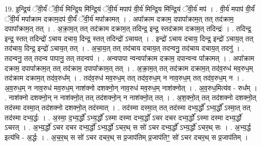 \documentclass[17pt]{extarticle}
\begin{document}
19. इ॒न्द्रि॒यं ॅवी॒र्यं॑ ॅवी॒र्य॑ मिन्द्रि॒य मि॑न्द्रि॒यं ॅवी॒र्य॑ मपाप॑ वी॒र्य॑ मिन्द्रि॒य मि॑न्द्रि॒यं ॅवी॒र्य॑ मप॑ । . वी॒र्य॑ मपाप॑ वी॒र्यं॑ ॅवी॒र्य॑ मपा᳚क्राम दक्राम॒दप॑ वी॒र्यं॑ ॅवी॒र्य॑ मपा᳚क्रामत् । . अपा᳚क्राम दक्राम॒ दपापा᳚क्राम॒त् तत् तद॑क्राम॒ दपापा᳚क्राम॒त् तत् । . अ॒क्रा॒म॒त् तत् तद॑क्राम दक्राम॒त् तदिन्द्र॒ इन्द्र॒ स्तद॑क्राम दक्राम॒त् तदिन्द्रः॑ । . तदिन्द्र॒ इन्द्र॒ स्तत् तदिन्द्रो॑ ऽचाय दचाय॒ दिन्द्र॒ स्तत् तदिन्द्रो॑ ऽचायत् । . इन्द्रो॑ ऽचाय दचाय॒ दिन्द्र॒ इन्द्रो॑ ऽचाय॒त् तत् तद॑चाय॒ दिन्द्र॒ इन्द्रो॑ ऽचाय॒त् तत् । . अ॒चा॒य॒त् तत् तद॑चाय दचाय॒त् तदन्वनु॒ तद॑चाय दचाय॒त् तदनु॑ । . तदन्वनु॒ तत् तदन्व पापानु॒ तत् तदन्वप॑ । . अन्वपापा न्वन्वपा᳚क्राम दक्राम॒ दपान्वन्व पा᳚क्रामत् । . अपा᳚क्राम दक्राम॒ दपापा᳚क्राम॒त् तत् तद॑क्राम॒ दपापा᳚क्राम॒त् तत् । . अ॒क्रा॒म॒त् तत् तद॑क्राम दक्राम॒त् तद॑व॒रुध॑ मव॒रुध॒म् तद॑क्राम दक्राम॒त् तद॑व॒रुध᳚म् । . तद॑व॒रुध॑ मव॒रुध॒म् तत् तद॑व॒रुध॒म् न नाव॒रुध॒म् तत् तद॑व॒रुध॒म् न । . अ॒व॒रुध॒म् न नाव॒रुध॑ मव॒रुध॒म् नाश॑क्नो दशक्नो॒न् नाव॒रुध॑ मव॒रुध॒म् नाश॑क्नोत् । . अ॒व॒रुध॒मित्य॑व - रुध᳚म् । . नाश॑क्नो दशक्नो॒न् न नाश॑क्नो॒त् तत् तद॑शक्नो॒न् न नाश॑क्नो॒त् तत् । . अ॒श॒क्नो॒त् तत् तद॑शक्नो दशक्नो॒त् तद॑स्मा दस्मा॒त् तद॑शक्नो दशक्नो॒त् तद॑स्मात् । . तद॑स्मा दस्मा॒त् तत् तद॑स्मा दभ्य॒र्द्धो᳚ ऽभ्य॒र्द्धो᳚ ऽस्मा॒त् तत् तद॑स्मा दभ्य॒र्द्धः । . अ॒स्मा॒ द॒भ्य॒र्द्धो᳚ ऽभ्य॒र्द्धो᳚ ऽस्मा दस्मा दभ्य॒र्द्धो॑ ऽचर दचर दभ्य॒र्द्धो᳚ ऽस्मा दस्मा दभ्य॒र्द्धो॑ ऽचरत् । . अ॒भ्य॒र्द्धो॑ ऽचर दचर दभ्य॒र्द्धो᳚ ऽभ्य॒र्द्धो॑ ऽचर॒थ् स सो॑ ऽचर दभ्य॒र्द्धो᳚ ऽभ्य॒र्द्धो॑ ऽचर॒थ् सः । . अ॒भ्य॒र्द्ध इत्य॑भि - अ॒र्द्धः । . अ॒च॒र॒थ् स सो॑ ऽचर दचर॒थ् स प्र॒जाप॑तिम् प्र॒जाप॑तिꣳ॒॒ सो॑ ऽचर दचर॒थ् स प्र॒जाप॑तिम् । \newline
\end{document}
